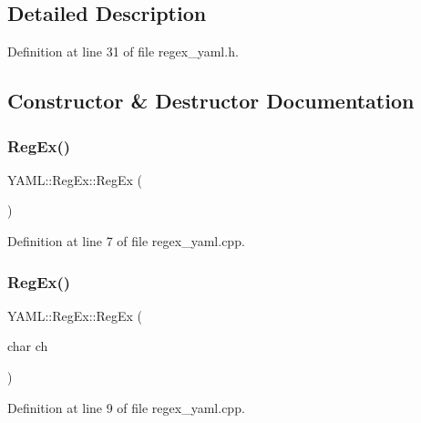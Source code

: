 \subsection{Detailed Description}


Definition at line 31 of file regex\+\_\+yaml.\+h.



\subsection{Constructor \& Destructor Documentation}
\mbox{\label{class_y_a_m_l_1_1_reg_ex_a0a5cddd7b593c6639719548354d06fb0}} 
\subsubsection{\texorpdfstring{RegEx()}{RegEx()}\hspace{0.1cm}{\footnotesize\ttfamily [1/4]}}
{\footnotesize\ttfamily Y\+A\+M\+L\+::\+Reg\+Ex\+::\+Reg\+Ex (\begin{DoxyParamCaption}{ }\end{DoxyParamCaption})}



Definition at line 7 of file regex\+\_\+yaml.\+cpp.

\mbox{\label{class_y_a_m_l_1_1_reg_ex_a8372b564902a9133eccfec69e419829c}} 
\subsubsection{\texorpdfstring{RegEx()}{RegEx()}\hspace{0.1cm}{\footnotesize\ttfamily [2/4]}}
{\footnotesize\ttfamily Y\+A\+M\+L\+::\+Reg\+Ex\+::\+Reg\+Ex (\begin{DoxyParamCaption}\item[{char}]{ch }\end{DoxyParamCaption})\hspace{0.3cm}{\ttfamily [explicit]}}



Definition at line 9 of file regex\+\_\+yaml.\+cpp.

\mbox{\label{class_y_a_m_l_1_1_reg_ex_a1542cf4dfc5063ab76e7c4a359a85964}} 
